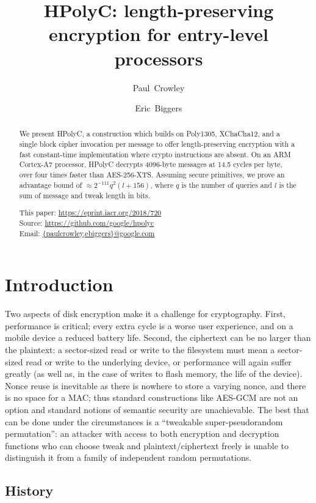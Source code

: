 \documentclass[letterpaper,luatex,11pt]{article}
\title{HPolyC: length-preserving encryption for entry-level processors}
\author{Paul~Crowley}
\author{Eric~Biggers}
\affil{Google LLC}
\begin{document}
\maketitle

\begin{abstract}
    We present HPolyC, a construction which builds on Poly1305, XChaCha12, and a
    single block cipher invocation per message to offer length-preserving
    encryption with a fast constant-time implementation where crypto
    instructions are absent.  On an ARM Cortex-A7 processor, HPolyC decrypts
    4096-byte messages at 14.5 cycles per byte, over four times faster than
    AES-256-XTS.
    Assuming secure primitives, we prove an advantage bound of
    $\approx 2^{-111}q^2(l + 156)$,
    where $q$ is the number of queries and $l$ is the sum of message and tweak length in bits.

    This paper: \url{https://eprint.iacr.org/2018/720} \\
    Source: \url{https://github.com/google/hpolyc} \\
    Email: \href{mailto:paulcrowley@google.com,ebiggers@google.com}{\{paulcrowley,ebiggers\}@google.com}
\end{abstract}

\section{Introduction}
Two aspects of disk encryption make it a challenge for cryptography.  First,
performance is critical; every extra cycle is a worse user experience, and on a mobile device
a reduced battery life.  Second, the ciphertext can be no larger than the plaintext: a sector-sized
read or write to the filesystem must mean a sector-sized read or write to the underlying device,
or performance will again suffer greatly
(as well as, in the case of writes to flash memory, the life of the device).
Nonce reuse is inevitable as there is nowhere to store a varying nonce, and there is no space
for a MAC; thus standard constructions like AES-GCM are not an option and standard notions
of semantic security are unachievable.  The best that can be done under the circumstances is
a ``tweakable super-pseudorandom permutation'': an attacker with access to both encryption
and decryption functions who can choose tweak and plaintext/ciphertext freely is unable to
distinguish it from a family of independent random permutations.

\subsection{History}
\end{document}
